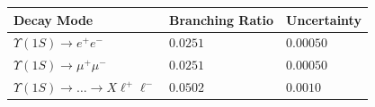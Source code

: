 \documentclass[landscape]{article}
\begin{document}
\hspace{1.5 cm}
\begin{minipage}{8 in}
\Large

\vspace{0.7 cm}
\begin{tabular}{p{4.6 in} p{2 in} p{1.3 in}}
Decay Mode & Branching Ratio & Uncertainty \\ \hline
$   \Upsilon(1S) \to e^+ e^-                      $ & $   0.0251   $ & $   0.00050   $ \\ 
$   \Upsilon(1S) \to \mu^+ \mu^-                  $ & $   0.0251   $ & $   0.00050   $ \\\hline\hline
$   \Upsilon(1S) \to \ldots \to X \ell^+ \ell^-   $ & $   0.0502   $ & $   0.0010    $ \\\hline
\end{tabular}


\end{minipage}
\end{document}
